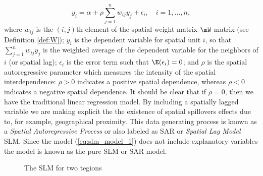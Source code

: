 \documentclass[english,12pt]{book}\usepackage[]{graphicx}\usepackage[]{xcolor}
\begin{document}
\begin{equation}\label{eq:slm_model_1}
y_i = \alpha +\rho \sum_{j = 1}^n w_{ij}y_j + \epsilon_i, \quad i = 1,...,n,
\end{equation}
%
where $w_{ij}$ is the $(i,j)$th element of the spatial weight matrix $\mW$ matrix (see Definition \ref{def:W}); $y_i$ is the dependent variable for spatial unit $i$, so that $\sum_{j = 1}^n w_{ij}y_j$ is the weighted average of the dependent variable for the neighbors of $i$ (or spatial lag); $\epsilon_i$ is the error term such that $\E(\epsilon_i)= 0$; and $\rho$ is the spatial autoregressive parameter which measures the intensity of the spatial interdependence: $\rho > 0$ indicates a positive spatial dependence, whereas $\rho < 0$ indicates a negative spatial dependence. It should be clear that if $\rho = 0$, then we have the traditional linear regression model. By including a spatially lagged variable we are making explicit the the existence of spatial spillovers effects due to, for example, geographical proximity. This data generating process is known as a \emph{Spatial Autoregressive Process} or also labeled as SAR or \emph{Spatial Lag Model} SLM. Since the model (\ref{eq:slm_model_1}) does not include explanatory variables the model is known as the pure SLM or SAR model. 

\begin{figure}[ht]

	\caption{The SLM for two tegions}\label{figure:slm}
		\centering
\end{figure}
\end{document}
